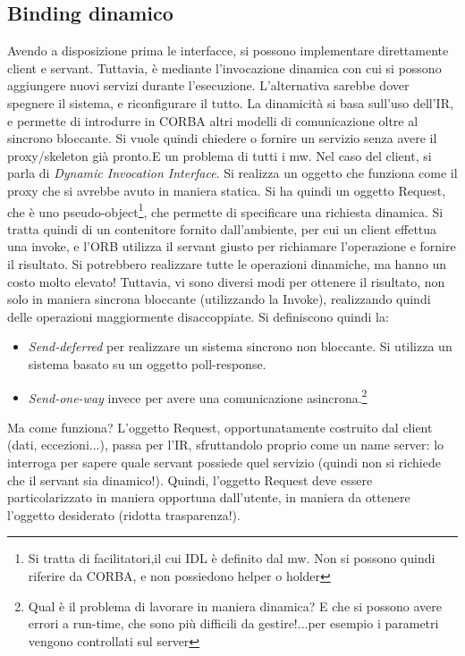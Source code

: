\subsection{Binding dinamico}
Avendo a disposizione prima le interfacce, si possono implementare direttamente client e servant. Tuttavia, è mediante
l'invocazione dinamica con cui si possono aggiungere nuovi servizi durante l'esecuzione. L'alternativa sarebbe
dover spegnere il sistema, e riconfigurare il tutto. La dinamicità si basa sull'uso dell'IR, e permette di introdurre in
CORBA altri modelli di comunicazione oltre al sincrono bloccante.
Si vuole quindi chiedere o fornire un servizio senza avere il proxy/skeleton già pronto.E un problema di tutti i mw.
Nel caso del client, si parla di \textit{Dynamic Invocation Interface}. Si realizza un oggetto che funziona come il
proxy che si avrebbe avuto in maniera statica. Si ha quindi un oggetto Request, che è uno pseudo-object\footnote{Si
tratta di facilitatori,il cui IDL è definito dal mw. Non si possono quindi riferire da CORBA,
e non possiedono helper o holder}, che permette di specificare una richiesta dinamica. Si tratta quindi di un
contenitore fornito dall'ambiente, per cui un client effettua una invoke, e l'ORB utilizza il servant giusto per
richiamare l'operazione e fornire il risultato. Si potrebbero realizzare tutte le operazioni dinamiche, ma hanno un
costo molto elevato! Tuttavia, vi sono diversi modi per ottenere il risultato, non solo in maniera sincrona bloccante
(utilizzando la Invoke), realizzando quindi delle operazioni maggiormente disaccoppiate. Si definiscono quindi la:
\begin{itemize}
 \item \textit{Send-deferred} per realizzare un sistema sincrono non bloccante. Si utilizza un sistema basato su un
 oggetto poll-response.
 \item \textit{Send-one-way} invece per avere una comunicazione asincrona.\footnote{Qual è il problema di lavorare in maniera
 dinamica? E che si possono avere errori a run-time, che sono più difficili da gestire!...per esempio i parametri vengono controllati sul server}
\end{itemize}
Ma come funziona? L'oggetto Request, opportunatamente costruito dal client (dati, eccezioni...), passa per l'IR,
sfruttandolo proprio come un name server: lo interroga per sapere quale servant possiede quel servizio (quindi non si
richiede che il servant sia dinamico!). Quindi, l'oggetto Request deve essere particolarizzato in maniera opportuna
dall'utente, in maniera da ottenere l'oggetto desiderato (ridotta trasparenza!).
